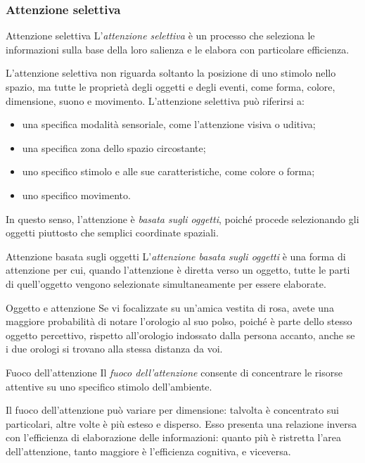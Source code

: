\documentclass[a4paper]{article}
\begin{document}
\subsubsection{Attenzione selettiva}
\begin{snippetdefinition}{Attenzione selettiva}
    L'\emph{attenzione selettiva} è un processo che seleziona le informazioni sulla base della loro salienza e le elabora con particolare efficienza.
\end{snippetdefinition}
L'attenzione selettiva non riguarda soltanto la posizione di uno stimolo nello spazio, ma tutte le proprietà degli oggetti e degli eventi, come forma, colore, dimensione, suono e movimento.
L'attenzione selettiva può riferirsi a:
\begin{itemize}
    \item una specifica modalità sensoriale, come l'attenzione visiva o uditiva;
    \item una specifica zona dello spazio circostante;
    \item uno specifico stimolo e alle sue caratteristiche, come colore o forma;
    \item uno specifico movimento.
\end{itemize}
In questo senso, l'attenzione è \emph{basata sugli oggetti}, poiché procede selezionando gli oggetti piuttosto che semplici coordinate spaziali.
\begin{snippetdefinition}{Attenzione basata sugli oggetti}
    L'\emph{attenzione basata sugli oggetti} è una forma di attenzione per cui, quando l'attenzione è diretta verso un oggetto, tutte le parti di quell'oggetto vengono selezionate simultaneamente per essere elaborate.
\end{snippetdefinition}
\begin{snippetexample}{Oggetto e attenzione}
    Se vi focalizzate su un'amica vestita di rosa, avete una maggiore probabilità di notare l'orologio al suo polso, poiché è parte dello stesso oggetto percettivo, rispetto all'orologio indossato dalla persona accanto, anche se i due orologi si trovano alla stessa distanza da voi.
\end{snippetexample}
\begin{snippetdefinition}{Fuoco dell'attenzione}
    Il \emph{fuoco dell'attenzione} consente di concentrare le risorse attentive su uno specifico stimolo dell'ambiente.
\end{snippetdefinition}
Il fuoco dell'attenzione può variare per dimensione: talvolta è concentrato sui particolari, altre volte è più esteso e disperso. Esso presenta una relazione inversa con l'efficienza di elaborazione delle informazioni: quanto più è ristretta l'area dell'attenzione, tanto maggiore è l'efficienza cognitiva, e viceversa.
\end{document}
